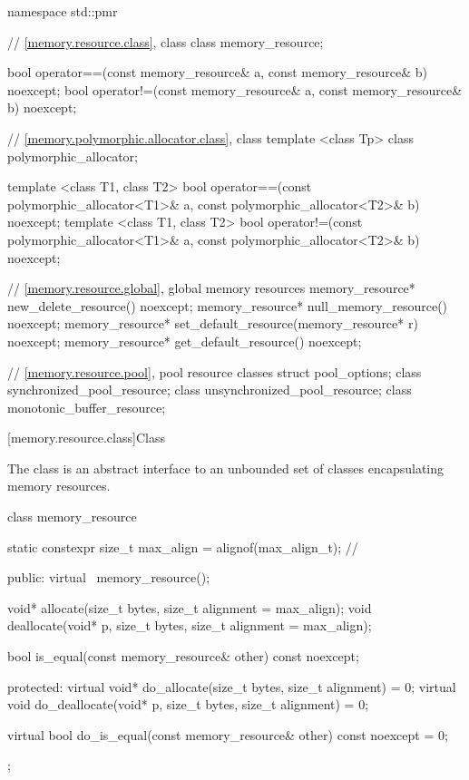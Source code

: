 %
\begin{codeblock}
namespace std::pmr {
  // \ref{memory.resource.class}, class 
  class memory_resource;

  bool operator==(const memory_resource& a, const memory_resource& b) noexcept;
  bool operator!=(const memory_resource& a, const memory_resource& b) noexcept;

  // \ref{memory.polymorphic.allocator.class}, class 
  template <class Tp> class polymorphic_allocator;

  template <class T1, class T2>
    bool operator==(const polymorphic_allocator<T1>& a,
                    const polymorphic_allocator<T2>& b) noexcept;
  template <class T1, class T2>
    bool operator!=(const polymorphic_allocator<T1>& a,
                    const polymorphic_allocator<T2>& b) noexcept;

  // \ref{memory.resource.global}, global memory resources
  memory_resource* new_delete_resource() noexcept;
  memory_resource* null_memory_resource() noexcept;
  memory_resource* set_default_resource(memory_resource* r) noexcept;
  memory_resource* get_default_resource() noexcept;

  // \ref{memory.resource.pool}, pool resource classes
  struct pool_options;
  class synchronized_pool_resource;
  class unsynchronized_pool_resource;
  class monotonic_buffer_resource;
}
\end{codeblock}

[memory.resource.class]{Class }

\pnum
The  class is an abstract interface to an unbounded set of classes encapsulating memory resources.

%
\begin{codeblock}
class memory_resource {
  static constexpr size_t max_align = alignof(max_align_t); // \expos

public:
  virtual ~memory_resource();

  void* allocate(size_t bytes, size_t alignment = max_align);
  void deallocate(void* p, size_t bytes, size_t alignment = max_align);

  bool is_equal(const memory_resource& other) const noexcept;

protected:
  virtual void* do_allocate(size_t bytes, size_t alignment) = 0;
  virtual void do_deallocate(void* p, size_t bytes, size_t alignment) = 0;

  virtual bool do_is_equal(const memory_resource& other) const noexcept = 0;
};
\end{codeblock}



